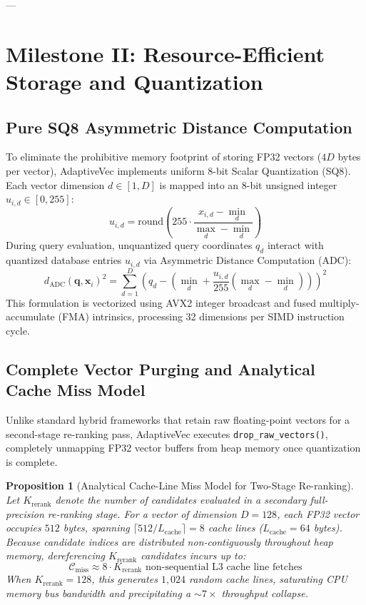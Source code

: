 \documentclass[10pt,journal,compsoc]{IEEEtran}
\newtheorem{proposition}{Proposition}
\begin{document}
---

\section{Milestone II: Resource-Efficient Storage and Quantization}
\label{sec:quantization}

\subsection{Pure SQ8 Asymmetric Distance Computation}
To eliminate the prohibitive memory footprint of storing FP32 vectors ($4D$ bytes per vector), AdaptiveVec implements uniform 8-bit Scalar Quantization (SQ8). Each vector dimension $d \in [1, D]$ is mapped into an 8-bit unsigned integer $u_{i,d} \in [0, 255]$:
\begin{equation}
u_{i,d} = \text{round}\left( 255 \cdot \frac{x_{i,d} - \min_d}{\max_d - \min_d} \right)
\end{equation}
During query evaluation, unquantized query coordinates $q_d$ interact with quantized database entries $u_{i,d}$ via Asymmetric Distance Computation (ADC):
\begin{equation}
d_{\text{ADC}}(\mathbf{q}, \mathbf{x}_i)^2 = \sum_{d=1}^D \left( q_d - \left( \min_d + \frac{u_{i,d}}{255} (\max_d - \min_d) \right) \right)^2
\end{equation}
This formulation is vectorized using AVX2 integer broadcast and fused multiply-accumulate (FMA) intrinsics, processing 32 dimensions per SIMD instruction cycle.

\subsection{Complete Vector Purging and Analytical Cache Miss Model}
Unlike standard hybrid frameworks that retain raw floating-point vectors for a second-stage re-ranking pass, AdaptiveVec executes \texttt{drop\_raw\_vectors()}, completely unmapping FP32 vector buffers from heap memory once quantization is complete.

\begin{proposition}[Analytical Cache-Line Miss Model for Two-Stage Re-ranking]
\label{prop:cache_miss}
Let $K_{\text{rerank}}$ denote the number of candidates evaluated in a secondary full-precision re-ranking stage. For a vector of dimension $D=128$, each FP32 vector occupies $512$ bytes, spanning $\lceil 512 / L_{\text{cache}} \rceil = 8$ cache lines ($L_{\text{cache}} = 64$ bytes). Because candidate indices are distributed non-contiguously throughout heap memory, dereferencing $K_{\text{rerank}}$ candidates incurs up to:
\begin{equation}
\mathcal{C}_{\text{miss}} \approx 8 \cdot K_{\text{rerank}} \text{ non-sequential L3 cache line fetches}
\end{equation}
When $K_{\text{rerank}} = 128$, this generates $1{,}024$ random cache lines, saturating CPU memory bus bandwidth and precipitating a $\sim 7\times$ throughput collapse.
\end{proposition}
\end{document}
